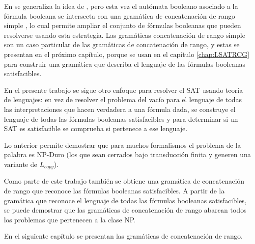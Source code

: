 En \cite{aSRCSAT} se generaliza la idea de \cite{aCFSAT}, pero esta vez el autómata booleano asociado a la fórmula booleana se intersecta con una gramática de concatenación de rango simple \cite{mainRCGBib}, lo cual permite ampliar el conjunto de fórmulas booleanas que pueden resolverse usando esta estrategia. Las gramáticas concatenación de rango simple son un caso particular de las gramáticas de concatenación de rango, y estas se presentan en el próximo capítulo, porque se usan en el capítulo \ref{chap:LSATRCG} para construir una gramática que 
describa el lenguaje de las fórmulas booleanas satisfacibles.

En el presente trabajo se sigue otro enfoque para resolver el SAT usando teoría de lenguajes: en vez de resolver el problema del vacío para el lenguaje de todas las interpretaciones que hacen verdadera a una fórmula dada, se construye el lenguaje de todas las fórmulas booleanas satisfacibles y para determinar si un SAT es satisfacible se comprueba si pertenece a ese lenguaje.

Lo anterior permite demostrar que para muchos formalismos el problema de la palabra es NP-Duro (los que sean cerrados bajo transducción finita y generen una variante de $L_{copy}$).

Como parte de este trabajo también se obtiene una gramática de concatenación de rango que reconoce las fórmulas booleanas satisfacibles. A partir de la gramática que reconoce el lenguaje de todas las fórmulas booleanas satisfacibles, se puede demostrar que las gramáticas de concatenación de rango abarcan todos los problemas que pertenecen a la clase NP.

En el siguiente capítulo se presentan las gramáticas de concatenación de rango.
